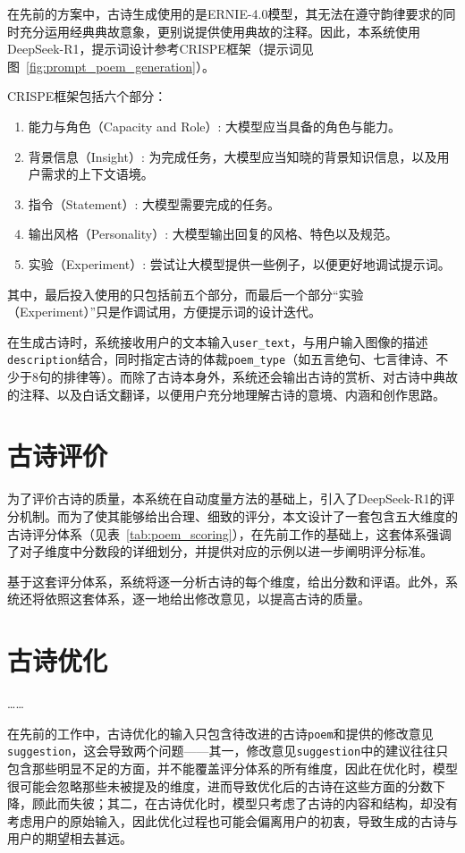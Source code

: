 在先前的方案中，古诗生成使用的是ERNIE-4.0模型，其无法在遵守韵律要求的同时充分运用经典典故意象，更别说提供使用典故的注释。因此，本系统使用DeepSeek-R1\cite{deepseek-aiDeepSeekR1IncentivizingReasoning2025}，提示词设计参考CRISPE框架（提示词见图~\ref{fig:prompt_poem_generation}）。

CRISPE框架包括六个部分：
\begin{enumerate}
  \item 能力与角色（Capacity and Role）: 大模型应当具备的角色与能力。
  \item 背景信息（Insight）: 为完成任务，大模型应当知晓的背景知识信息，以及用户需求的上下文语境。
  \item 指令（Statement）: 大模型需要完成的任务。
  \item 输出风格（Personality）: 大模型输出回复的风格、特色以及规范。
  \item 实验（Experiment）: 尝试让大模型提供一些例子，以便更好地调试提示词。
\end{enumerate}

其中，最后投入使用的只包括前五个部分，而最后一个部分“实验（Experiment）”只是作调试用，方便提示词的设计迭代。

在生成古诗时，系统接收用户的文本输入\verb|user_text|，与用户输入图像的描述\verb|description|结合，同时指定古诗的体裁\verb|poem_type|（如五言绝句、七言律诗、不少于8句的排律等）。而除了古诗本身外，系统还会输出古诗的赏析、对古诗中典故的注释、以及白话文翻译，以便用户充分地理解古诗的意境、内涵和创作思路。


\section{古诗评价}

为了评价古诗的质量，本系统在自动度量方法的基础上，引入了DeepSeek-R1的评分机制。而为了使其能够给出合理、细致的评分，本文设计了一套包含五大维度的古诗评分体系（见表~\ref{tab:poem_scoring}），在先前工作的基础上，这套体系强调了对子维度中分数段的详细划分，并提供对应的示例以进一步阐明评分标准。

基于这套评分体系，系统将逐一分析古诗的每个维度，给出分数和评语。此外，系统还将依照这套体系，逐一地给出修改意见，以提高古诗的质量。

\section{古诗优化}

……

在先前的工作中，古诗优化的输入只包含待改进的古诗\verb|poem|和提供的修改意见\verb|suggestion|，这会导致两个问题——其一，修改意见\verb|suggestion|中的建议往往只包含那些明显不足的方面，并不能覆盖评分体系的所有维度，因此在优化时，模型很可能会忽略那些未被提及的维度，进而导致优化后的古诗在这些方面的分数下降，顾此而失彼；其二，在古诗优化时，模型只考虑了古诗的内容和结构，却没有考虑用户的原始输入，因此优化过程也可能会偏离用户的初衷，导致生成的古诗与用户的期望相去甚远。


